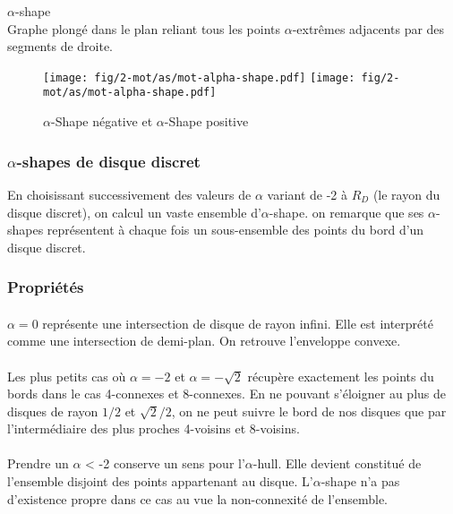 \begin{Definition}{$\alpha$-shape}\\
\label{def:as}
      Graphe plongé dans le plan reliant tous les points $\alpha$-extrêmes adjacents par des segments de droite.
\end{Definition}

\begin{figure}[H]
  \centering
  \texttt{[image: fig/2-mot/as/mot-alpha-shape.pdf]}
  \texttt{[image: fig/2-mot/as/mot-alpha-shape.pdf]}
  \caption{$\alpha$-Shape négative et $\alpha$-Shape positive }
\end{figure}


\subsubsection{$\alpha$-shapes de disque discret}

En choisissant successivement des valeurs de $\alpha$ variant de -2 à $R_D$ (le rayon du disque discret), on calcul un vaste ensemble d'$\alpha$-shape. on remarque que ses $\alpha$-shapes représentent à chaque fois un sous-ensemble des points du bord d'un disque discret.

\subsubsection{Propriétés}

\paragraph{}
$\alpha = 0$ représente une intersection de disque de rayon infini. Elle est interprété comme une intersection de demi-plan. On retrouve l'enveloppe convexe.

\paragraph{}
Les plus petits cas où $\alpha = -2$ et $\alpha = -\sqrt{2}$ récupère exactement les points du bords dans le cas 4-connexes et 8-connexes. En ne pouvant s'éloigner au plus de disques de rayon $1/2$ et $\sqrt{2}/2$, on ne peut suivre le bord de nos disques que par l'intermédiaire des plus proches 4-voisins et 8-voisins.

\paragraph{}
Prendre un $\alpha$ < -2 conserve un sens pour l'$\alpha$-hull. Elle devient constitué de l'ensemble disjoint des points appartenant au disque. L'$\alpha$-shape n'a pas d'existence propre dans ce cas au vue la non-connexité de l'ensemble.

